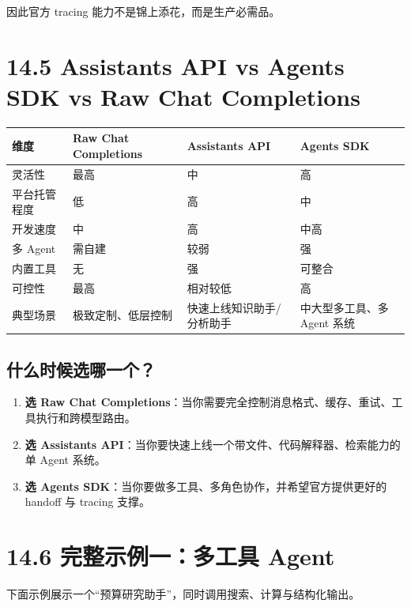 因此官方 tracing 能力不是锦上添花，而是生产必需品。


\section{14.5 Assistants API vs Agents SDK vs Raw Chat Completions}

\begingroup
\scriptsize
\setlength{\tabcolsep}{3pt}
\begin{longtable}{|p{}|p{}|p{}|p{}|}
\hline
维度 & Raw Chat Completions & Assistants API & Agents SDK \\ \hline
灵活性 & 最高 & 中 & 高 \\ \hline
平台托管程度 & 低 & 高 & 中 \\ \hline
开发速度 & 中 & 高 & 中高 \\ \hline
多 Agent & 需自建 & 较弱 & 强 \\ \hline
内置工具 & 无 & 强 & 可整合 \\ \hline
可控性 & 最高 & 相对较低 & 高 \\ \hline
典型场景 & 极致定制、低层控制 & 快速上线知识助手/分析助手 & 中大型多工具、多 Agent 系统 \\ \hline
\end{longtable}
\endgroup

\subsection{什么时候选哪一个？}

\begin{enumerate}[leftmargin=2em]
\item \textbf{选 Raw Chat Completions}：当你需要完全控制消息格式、缓存、重试、工具执行和跨模型路由。
\item \textbf{选 Assistants API}：当你要快速上线一个带文件、代码解释器、检索能力的单 Agent 系统。
\item \textbf{选 Agents SDK}：当你要做多工具、多角色协作，并希望官方提供更好的 handoff 与 tracing 支撑。
\end{enumerate}

\section{14.6 完整示例一：多工具 Agent}

下面示例展示一个``预算研究助手''，同时调用搜索、计算与结构化输出。


